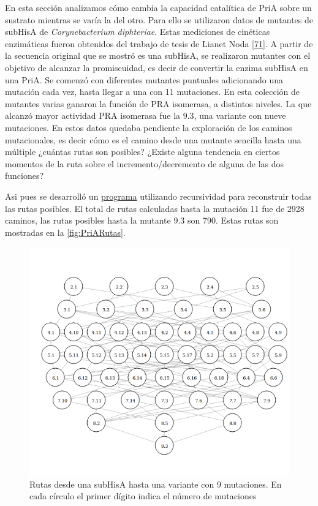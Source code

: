 \documentclass[12pt,twoside]{reedthesis}
\begin{document}
  En esta sección analizamos cómo cambia la capacidad catalítica de PriA
  sobre un sustrato mientras se varía la del otro. Para ello se utilizaron
  datos de mutantes de subHisA de \emph{Corynebacterium diphteriae}. Estas
  mediciones de cinéticas enzimáticas fueron obtenidos del trabajo de
  tesis de Lianet Noda {[}\protect\hyperlink{ref-noda_tesis_2012}{71}{]}.
  A partir de la secuencia original que se mostró es una subHisA, se
  realizaron mutantes con el objetivo de alcanzar la promiscuidad, es
  decir de convertir la enzima subHisA en una PriA. Se comenzó con
  diferentes mutantes puntuales adicionando una mutación cada vez, hasta
  llegar a una con 11 mutaciones. En esta colección de mutantes varias
  ganaron la función de PRA isomerasa, a distintos niveles. La que alcanzó
  mayor actividad PRA isomerasa fue la \(9.3\), una variante con nueve
  mutaciones. En estos datos quedaba pendiente la exploración de los
  caminos mutacionales, es decir cómo es el camino desde una mutante
  sencilla hasta una múltiple ¿cuántas rutas son posibles? ¿Existe alguna
  tendencia en ciertos momentos de la ruta sobre el incremento/decremento
  de alguna de las dos funciones?
  
  Asi pues se desarrolló un
  \href{https://github.com/nselem/perlas/tree/master/LiaTrayectory}{programa}
  utilizando recursividad para reconstruir todas las rutas posibles. El
  total de rutas calculadas hasta la mutación 11 fue de 2928 caminos, las
  rutas posibles hasta la mutante 9.3 son 790. Estas rutas son mostradas
  en la \autoref{fig:PriARutas}.
  
  \begin{figure}[h!tbp]
  \centering
  \includegraphics[angle = 0,scale = 0.6]{conclusion/Solocirculos.png}
  \caption[Rutas desde una subHisA hasta una variante con 9 mutaciones]{\footnotesize{Rutas desde una subHisA hasta una variante con 9 mutaciones. En cada círculo el primer dígito indica el número de mutaciones}}
  \label{fig:PriARutas}
  \end{figure}
  
\end{document}

